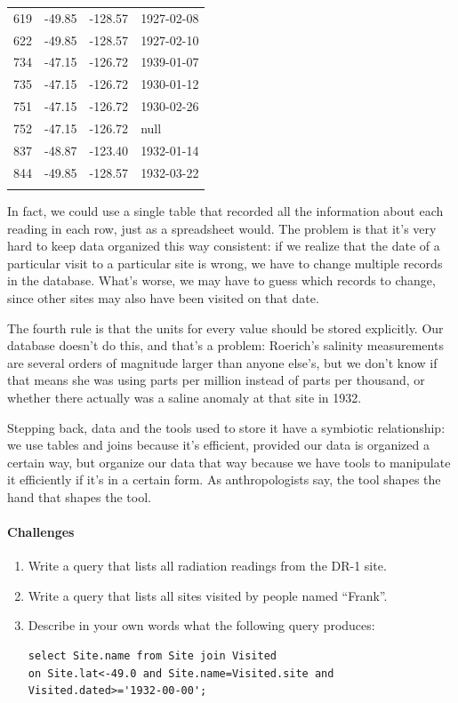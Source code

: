 \documentclass[]{book}
\begin{document}
\begin{longtable}[c]{@{}llll@{}}
\hline\noalign{\medskip}
619 & -49.85 & -128.57 & 1927-02-08
\\\noalign{\medskip}
622 & -49.85 & -128.57 & 1927-02-10
\\\noalign{\medskip}
734 & -47.15 & -126.72 & 1939-01-07
\\\noalign{\medskip}
735 & -47.15 & -126.72 & 1930-01-12
\\\noalign{\medskip}
751 & -47.15 & -126.72 & 1930-02-26
\\\noalign{\medskip}
752 & -47.15 & -126.72 & null
\\\noalign{\medskip}
837 & -48.87 & -123.40 & 1932-01-14
\\\noalign{\medskip}
844 & -49.85 & -128.57 & 1932-03-22
\\\noalign{\medskip}
\hline
\end{longtable}

In fact, we could use a single table that recorded all the information
about each reading in each row, just as a spreadsheet would. The problem
is that it's very hard to keep data organized this way consistent: if we
realize that the date of a particular visit to a particular site is
wrong, we have to change multiple records in the database. What's worse,
we may have to guess which records to change, since other sites may also
have been visited on that date.

The fourth rule is that the units for every value should be stored
explicitly. Our database doesn't do this, and that's a problem:
Roerich's salinity measurements are several orders of magnitude larger
than anyone else's, but we don't know if that means she was using parts
per million instead of parts per thousand, or whether there actually was
a saline anomaly at that site in 1932.

Stepping back, data and the tools used to store it have a symbiotic
relationship: we use tables and joins because it's efficient, provided
our data is organized a certain way, but organize our data that way
because we have tools to manipulate it efficiently if it's in a certain
form. As anthropologists say, the tool shapes the hand that shapes the
tool.

\mbox{}\paragraph{Challenges}

\begin{enumerate}
\item
  Write a query that lists all radiation readings from the DR-1 site.
\item
  Write a query that lists all sites visited by people named ``Frank''.
\item
  Describe in your own words what the following query produces:

\begin{verbatim}
select Site.name from Site join Visited
on Site.lat<-49.0 and Site.name=Visited.site and Visited.dated>='1932-00-00';
\end{verbatim}
\end{enumerate}
\end{document}
